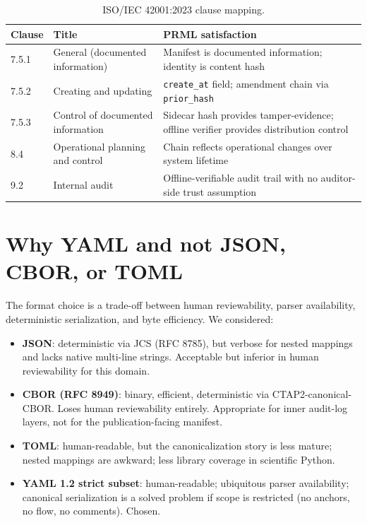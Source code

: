 \documentclass[11pt, a4paper]{article}
\begin{document}
\begin{table}[h]
\centering
\small
\begin{tabular}{@{}l p{5cm} p{6cm}@{}}
\toprule
Clause & Title & PRML satisfaction \\
\midrule
7.5.1 & General (documented information) & Manifest is documented information; identity is content hash \\
7.5.2 & Creating and updating & \texttt{create\_at} field; amendment chain via \texttt{prior\_hash} \\
7.5.3 & Control of documented information & Sidecar hash provides tamper-evidence; offline verifier provides distribution control \\
8.4 & Operational planning and control & Chain reflects operational changes over system lifetime \\
9.2 & Internal audit & Offline-verifiable audit trail with no auditor-side trust assumption \\
\bottomrule
\end{tabular}
\caption{ISO/IEC 42001:2023 clause mapping.}
\end{table}

\section{Why YAML and not JSON, CBOR, or TOML}
\label{app:why-yaml}

The format choice is a trade-off between human reviewability, parser availability, deterministic serialization, and byte efficiency. We considered:

\begin{itemize}[leftmargin=2em, itemsep=0.2em]
  \item \textbf{JSON}: deterministic via JCS (RFC 8785), but verbose for nested mappings and lacks native multi-line strings. Acceptable but inferior in human reviewability for this domain.
  \item \textbf{CBOR (RFC 8949)}: binary, efficient, deterministic via CTAP2-canonical-CBOR. Loses human reviewability entirely. Appropriate for inner audit-log layers, not for the publication-facing manifest.
  \item \textbf{TOML}: human-readable, but the canonicalization story is less mature; nested mappings are awkward; less library coverage in scientific Python.
  \item \textbf{YAML 1.2 strict subset}: human-readable; ubiquitous parser availability; canonical serialization is a solved problem if scope is restricted (no anchors, no flow, no comments). Chosen.
\end{itemize}
\end{document}

